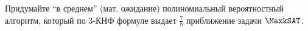 Придумайте ``в среднем'' (мат. ожидание) полиномиальный вероятностный алгоритм, который по $3$-КНФ формуле выдает
$\frac{7}{8}$ приближение задачи $\MaxkSAT$.